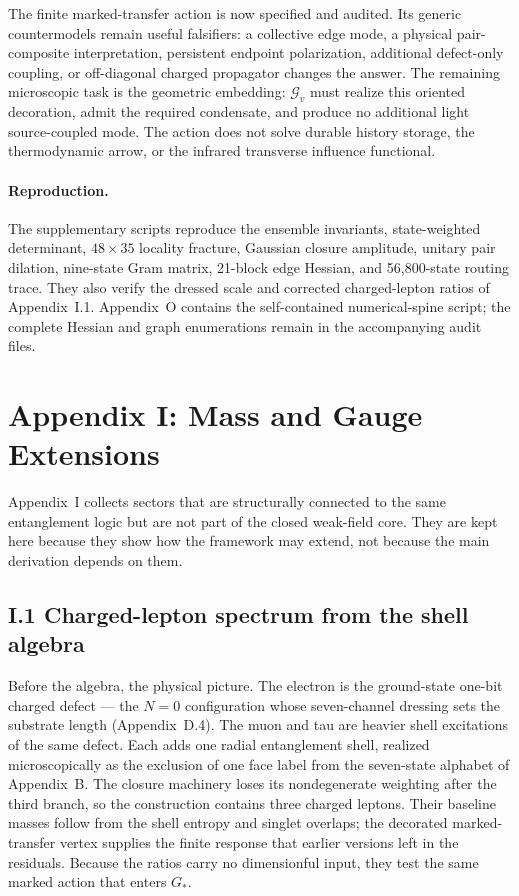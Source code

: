\documentclass[11pt]{article}
\begin{document}
The finite marked-transfer action is now specified and audited. Its generic countermodels remain useful falsifiers: a collective edge mode, a physical pair-composite interpretation, persistent endpoint polarization, additional defect-only coupling, or off-diagonal charged propagator changes the answer. The remaining microscopic task is the geometric embedding: $\mathcal G_v$ must realize this oriented decoration, admit the required condensate, and produce no additional light source-coupled mode. The action does not solve durable history storage, the thermodynamic arrow, or the infrared transverse influence functional.

\paragraph{Reproduction.}
The supplementary scripts reproduce the ensemble invariants, state-weighted determinant, $48\times35$ locality fracture, Gaussian closure amplitude, unitary pair dilation, nine-state Gram matrix, 21-block edge Hessian, and 56,800-state routing trace. They also verify the dressed scale and corrected charged-lepton ratios of Appendix~I.1. Appendix~O contains the self-contained numerical-spine script; the complete Hessian and graph enumerations remain in the accompanying audit files.

\section*{Appendix I: Mass and Gauge Extensions}

Appendix~I collects sectors that are structurally connected to the same entanglement logic but are not part of the closed weak-field core. They are kept here because they show how the framework may extend, not because the main derivation depends on them.

\subsection*{I.1 Charged-lepton spectrum from the shell algebra}

Before the algebra, the physical picture. The electron is the ground-state one-bit charged defect --- the $N=0$ configuration whose seven-channel dressing sets the substrate length (Appendix~D.4). The muon and tau are heavier shell excitations of the same defect. Each adds one radial entanglement shell, realized microscopically as the exclusion of one face label from the seven-state alphabet of Appendix~B. The closure machinery loses its nondegenerate weighting after the third branch, so the construction contains three charged leptons. Their baseline masses follow from the shell entropy and singlet overlaps; the decorated marked-transfer vertex supplies the finite response that earlier versions left in the residuals. Because the ratios carry no dimensionful input, they test the same marked action that enters $G_*$.
\end{document}
